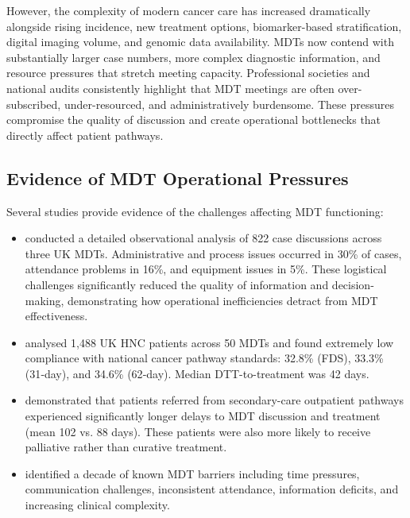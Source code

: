 However, the complexity of modern cancer care has increased dramatically alongside rising incidence, new treatment options, biomarker-based stratification, digital imaging volume, and genomic data availability. MDTs now contend with substantially larger case numbers, more complex diagnostic information, and resource pressures that stretch meeting capacity. Professional societies and national audits consistently highlight that MDT meetings are often over-subscribed, under-resourced, and administratively burdensome. These pressures compromise the quality of discussion and create operational bottlenecks that directly affect patient pathways.

\subsection{Evidence of MDT Operational Pressures}

Several studies provide evidence of the challenges affecting MDT functioning:

\begin{itemize}
    \item \cite{soukup2022} conducted a detailed observational analysis of 822 case discussions across three UK MDTs. Administrative and process issues occurred in 30\% of cases, attendance problems in 16\%, and equipment issues in 5\%. These logistical challenges significantly reduced the quality of information and decision-making, demonstrating how operational inefficiencies detract from MDT effectiveness.
    \item \cite{lim2025} analysed 1,488 UK HNC patients across 50 MDTs and found extremely low compliance with national cancer pathway standards: 32.8\% (FDS), 33.3\% (31‑day), and 34.6\% (62‑day). Median DTT-to-treatment was 42 days.
    \item \cite{chakravarty2023} demonstrated that patients referred from secondary-care outpatient pathways experienced significantly longer delays to MDT discussion and treatment (mean 102 vs. 88 days). These patients were also more likely to receive palliative rather than curative treatment.
    \item \cite{law2024} identified a decade of known MDT barriers including time pressures, communication challenges, inconsistent attendance, information deficits, and increasing clinical complexity.
\end{itemize}

